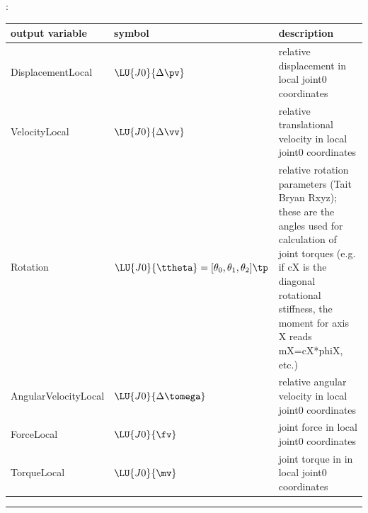:
\begin{center}
\footnotesize
\begin{longtable}{| p{5cm} | p{5cm} | p{6cm} |} 
\hline
\bf output variable & \bf symbol & \bf description \\ \hline
DisplacementLocal & $\LU{J0}{\Delta\pv}$ & relative displacement in local joint0 coordinates\\ \hline
VelocityLocal & $\LU{J0}{\Delta\vv}$ & relative translational velocity in local joint0 coordinates\\ \hline
Rotation & $\LU{J0}{\ttheta}= [\theta_0,\theta_1,\theta_2]\tp$ & relative rotation parameters (Tait Bryan Rxyz); these are the angles used for calculation of joint torques (e.g. if cX is the diagonal rotational stiffness, the moment for axis X reads mX=cX*phiX, etc.)\\ \hline
AngularVelocityLocal & $\LU{J0}{\Delta\tomega}$ & relative angular velocity in local joint0 coordinates\\ \hline
ForceLocal & $\LU{J0}{\fv}$ & joint force in local joint0 coordinates\\ \hline
TorqueLocal & $\LU{J0}{\mv}$ & joint torque in in local joint0 coordinates\\ \hline
\end{longtable}
\end{center}
\par\noindent\rule{\textwidth}{0.4pt}
\label{description_ObjectConnectorRigidBodySpringDamper}
